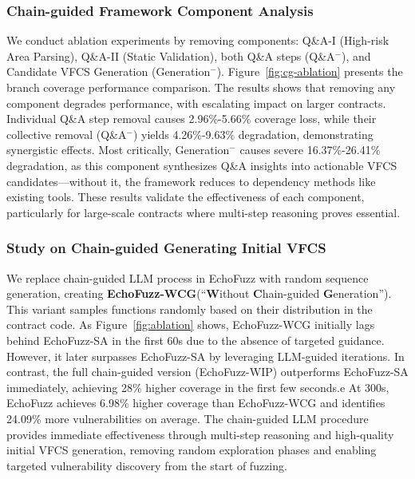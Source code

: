 \documentclass[sigconf]{acmart}
\newcommand{\ToolName}{\textcolor{ToolNameColor}{\textsf{{EchoFuzz}}}}
\begin{document}
\begin{sloppypar}
\subsubsection{Chain-guided Framework Component Analysis}
We conduct ablation experiments by removing components: Q\&A-I (High-risk Area Parsing), Q\&A-II (Static Validation), both Q\&A steps (Q\&A$^{-}$), and Candidate VFCS Generation (Generation$^{-}$).
Figure~\ref{fig:cg-ablation} presents the branch coverage performance comparison. The results shows that removing any component degrades performance, with escalating impact on larger contracts. Individual Q\&A step removal causes 2.96\%-5.66\% coverage loss, while their collective removal (Q\&A$^{-}$) yields 4.26\%-9.63\% degradation, demonstrating synergistic effects. Most critically, Generation$^{-}$ causes severe 16.37\%-26.41\% degradation, as this component synthesizes Q\&A insights into actionable VFCS candidates—without it, the framework reduces to dependency methods like existing tools.
These results validate the effectiveness of each component, particularly for large-scale contracts where multi-step reasoning proves essential.




\vspace{-2pt}
\subsubsection{Study on Chain-guided Generating Initial VFCS}
We replace chain-guided LLM process in \ToolName{} with random sequence generation, creating \textbf{EchoFuzz-WCG}(``\textbf{W}ithout \textbf{C}hain-guided \textbf{G}eneration'').
%
This variant samples functions randomly based on their distribution in the contract code.
%
As Figure~\ref{fig:ablation} shows, EchoFuzz-WCG initially lags behind EchoFuzz-SA in the first 60s due to the absence of targeted guidance. However, it later surpasses EchoFuzz-SA by leveraging LLM-guided iterations.
%
In contrast, the full chain-guided version (EchoFuzz-WIP) outperforms EchoFuzz-SA immediately, achieving 28\% higher coverage in the first few seconds.e
At 300s, \ToolName{} achieves 6.98\% higher coverage than EchoFuzz-WCG and identifies 24.09\% more vulnerabilities on average.
The chain-guided LLM procedure provides immediate effectiveness through multi-step reasoning and high-quality initial VFCS generation, removing random exploration phases and enabling targeted vulnerability discovery from the start of fuzzing.




\end{sloppypar}
\end{document}
